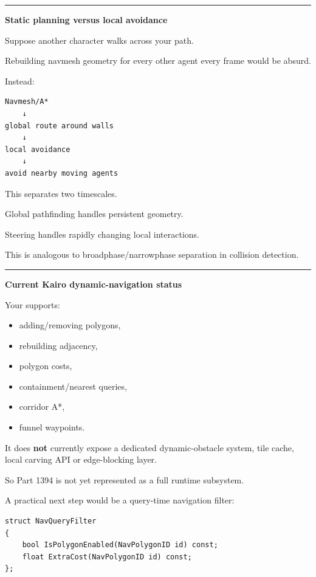 \begin{center}\rule{0.5\linewidth}{0.5pt}\end{center}

\textbf{Static planning versus local avoidance}

Suppose another character walks across your path.

Rebuilding navmesh geometry for every other agent every frame would be absurd.

Instead:

\begin{verbatim}
Navmesh/A*
    ↓
global route around walls
    ↓
local avoidance
    ↓
avoid nearby moving agents
\end{verbatim}

This separates two timescales.

Global pathfinding handles persistent geometry.

Steering handles rapidly changing local interactions.

This is analogous to broadphase/narrowphase separation in collision detection.

\begin{center}\rule{0.5\linewidth}{0.5pt}\end{center}

\textbf{Current Kairo dynamic-navigation status}

Your  supports:

\begin{itemize}
\tightlist
\item
  adding/removing polygons,
\item
  rebuilding adjacency,
\item
  polygon costs,
\item
  containment/nearest queries,
\item
  corridor A*,
\item
  funnel waypoints.
\end{itemize}

It does \textbf{not} currently expose a dedicated dynamic-obstacle system, tile cache, local carving API or edge-blocking layer.

So Part 1394 is not yet represented as a full runtime subsystem.

A practical next step would be a query-time navigation filter:

\begin{verbatim}
struct NavQueryFilter
{
    bool IsPolygonEnabled(NavPolygonID id) const;
    float ExtraCost(NavPolygonID id) const;
};
\end{verbatim}

